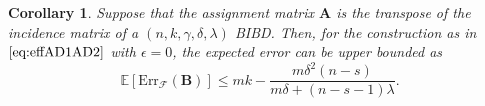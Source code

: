 \documentclass[journal,draftcls,onecolumn]{IEEEtran}
\theoremstyle{mystyle}
\newtheorem{cor}{Corollary}
\newtheorem{remark}{Remark}
\newcommand{\aditya}[1]{\marginpar{+}{\bf Aditya's remark}: {\em #1}}
\newcommand{\sifat}[1]{\marginpar{+}{\bf Sifat's remark}: {\em #1}}
\begin{document}
 
\begin{cor} \label{cor:BIBD}
Suppose that the assignment matrix $\mathbf{A}$ is the transpose of the incidence matrix of a $(n,k,\gamma,\delta,\lambda)$ BIBD. %
Then, for the construction as in $\eqref{eq:effAD1AD2}$ with $\epsilon  = 0$, the expected error can be upper bounded as
\begin{equation} \label{eq:AD1AD2err_BIBD}
\mathbb{E}[\text{Err}_{\mathcal{F}}(\mathbf{B})] \le mk -   \frac{m\delta^2(n-s)} {m\delta + (n-s-1)\lambda}.
\end{equation}
\end{cor}
\end{document}
